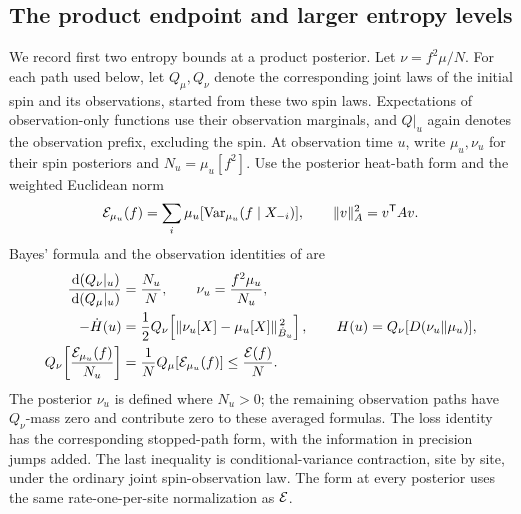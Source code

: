 \subsection{The product endpoint and larger entropy levels}
\label{warm:large-section}

We record first two entropy bounds at a product posterior.  Let
\(\nu=f^2\mu/N\).  For each path used below, let \(Q_\mu,Q_\nu\)
denote the corresponding joint laws of the initial spin and its
observations, started from these two spin laws.  Expectations of
observation-only functions use their observation marginals, and
\(Q|_u\) again denotes the observation prefix, excluding the spin.
At observation time \(u\), write \(\mu_u,\nu_u\) for their spin
posteriors and \(N_u=\mu_u[f^2]\).  Use the posterior heat-bath form and
the weighted Euclidean norm
\[
 \mathcal E_{\mu_u}(f)=\sum_i\mu_u[\operatorname{Var}_{\mu_u}(f\mid X_{-i})],
 \qquad \|v\|_A^2=v^{\mathsf T}Av.
\]
Bayes' formula and the observation
identities of \cite[Lemma~19.2, Equations~(19.6)--(19.8)]{CM} are
\begin{align}
 \frac{\,\mathrm d(Q_\nu|_u)}{\,\mathrm d(Q_\mu|_u)}
       &=\frac{N_u}{N},\qquad \nu_u=\frac{f^2\mu_u}{N_u},
                                                               \label{warm:posterior-likelihood}\\
 -\dot H(u)
       &=\frac12 Q_\nu\!\left[
             \|\nu_u[X]-\mu_u[X]\|_{\dot B_u}^{\,2}\right],
 \qquad H(u)=Q_\nu[D(\nu_u\Vert\mu_u)],
                                                               \label{warm:spin-loss}\\
 Q_\nu\!\left[\frac{\mathcal E_{\mu_u}(f)}{N_u}\right]
       &=\frac1N Q_\mu[\mathcal E_{\mu_u}(f)]
       \le\frac{\mathcal E(f)}N .                                \label{warm:conditioned-energy}
\end{align}
The posterior \(\nu_u\) is defined where \(N_u>0\); the remaining
observation paths have \(Q_\nu\)-mass zero and contribute zero to
these averaged formulas.
The loss identity has the corresponding stopped-path form, with the
information in precision jumps added.  The last inequality is
conditional-variance contraction, site by site, under the ordinary
joint spin-observation law.  The form at every posterior uses the
same rate-one-per-site normalization as \(\mathcal E\).

